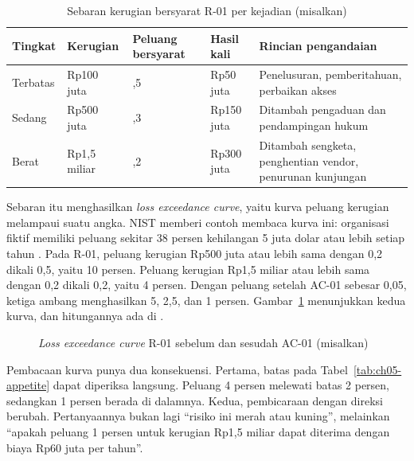 \begin{table}[!htb]
  \centering\small
  \caption{Sebaran kerugian bersyarat R-01 per kejadian (misalkan)}\label{tab:ch05-sebaran}
  \begin{tabularx}{\textwidth}{|>{\raggedright\arraybackslash}p{}|>{\raggedright\arraybackslash}p{}|>{\raggedright\arraybackslash}p{}|>{\raggedright\arraybackslash}p{}|>{\raggedright\arraybackslash}X|}
    \hline
    \textbf{Tingkat} & \textbf{Kerugian} & \textbf{Peluang bersyarat} & \textbf{Hasil kali} &
    \textbf{Rincian pengandaian} \\ \hline
    Terbatas & Rp100 juta & 0,5 & Rp50 juta & Penelusuran, pemberitahuan, perbaikan akses \\ \hline
    Sedang & Rp500 juta & 0,3 & Rp150 juta & Ditambah pengaduan dan pendampingan hukum \\ \hline
    Berat & Rp1,5 miliar & 0,2 & Rp300 juta & Ditambah sengketa, penghentian vendor, penurunan
    kunjungan \\ \hline
  \end{tabularx}
\end{table}

Sebaran itu menghasilkan \textit{loss exceedance curve}, yaitu kurva peluang kerugian melampaui suatu
angka. NIST memberi contoh membaca kurva ini: organisasi fiktif memiliki peluang sekitar 38 persen
kehilangan 5 juta dolar atau lebih setiap tahun \cite{c05-nist-ir8286r1}. Pada R-01, peluang kerugian
Rp500 juta atau lebih sama dengan 0,2 dikali 0,5, yaitu 10 persen. Peluang kerugian Rp1,5 miliar atau
lebih sama dengan 0,2 dikali 0,2, yaitu 4 persen. Dengan peluang setelah AC-01 sebesar 0,05, ketiga
ambang menghasilkan 5, 2,5, dan 1 persen. Gambar~\ref{fig:ch05-kurva} menunjukkan kedua kurva, dan
hitungannya ada di .

\begin{figure}[!htb]
  \centering
  
  \caption{\textit{Loss exceedance curve} R-01 sebelum dan sesudah AC-01 (misalkan)}
  \label{fig:ch05-kurva}
\end{figure}

Pembacaan kurva punya dua konsekuensi. Pertama, batas pada Tabel~\ref{tab:ch05-appetite} dapat
diperiksa langsung. Peluang 4 persen melewati batas 2 persen, sedangkan 1 persen berada di dalamnya.
Kedua, pembicaraan dengan direksi berubah. Pertanyaannya bukan lagi ``risiko ini merah atau kuning'',
melainkan ``apakah peluang 1 persen untuk kerugian Rp1,5 miliar dapat diterima dengan biaya Rp60 juta
per tahun''.

